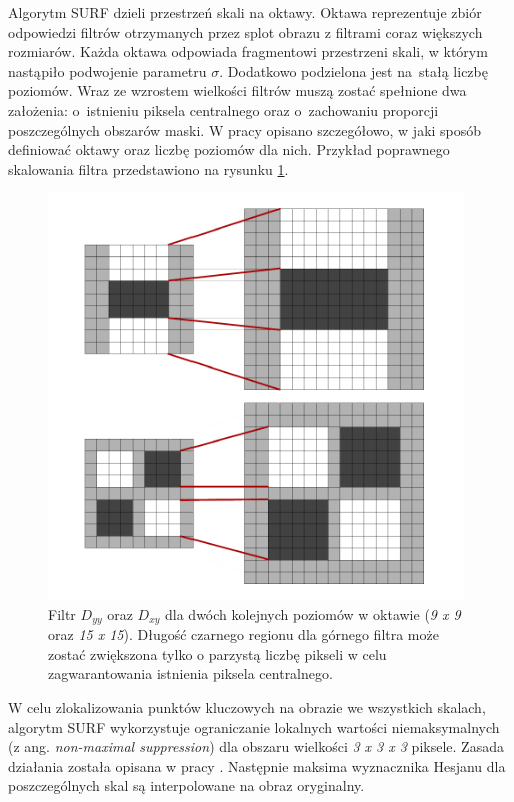 Algorytm SURF dzieli przestrzeń skali na oktawy. Oktawa reprezentuje zbiór odpowiedzi filtrów otrzymanych przez splot obrazu z filtrami coraz większych rozmiarów. Każda oktawa odpowiada fragmentowi przestrzeni skali, w którym nastąpiło podwojenie parametru $\sigma$. Dodatkowo podzielona jest na~stałą liczbę poziomów. Wraz ze wzrostem wielkości filtrów muszą zostać spełnione dwa założenia: o~istnieniu piksela centralnego oraz o~zachowaniu proporcji poszczególnych obszarów maski. W pracy \cite{Surf} opisano szczegółowo, w jaki sposób definiować oktawy oraz liczbę poziomów dla nich. Przykład poprawnego skalowania filtra przedstawiono na rysunku \ref{im: FiltersScale}. 
 
 \begin{figure}[h]
 	\includegraphics[width=11cm]{FiltersScale}
 	\centering
 	\caption{Filtr $D_{yy}$ oraz $D_{xy}$ dla dwóch kolejnych poziomów w oktawie (\textit{9 x 9} oraz \textit{15 x 15}). Długość czarnego regionu dla górnego filtra może zostać zwiększona tylko o parzystą liczbę pikseli w celu zagwarantowania istnienia piksela centralnego.}
 	\label{im: FiltersScale}
 \end{figure}
 
W celu zlokalizowania punktów kluczowych na obrazie we wszystkich skalach, algorytm SURF wykorzystuje ograniczanie lokalnych wartości niemaksymalnych (z ang. \textit{non-maximal suppression}) dla obszaru wielkości \textit{3 x 3 x 3} piksele. Zasada działania została opisana w pracy \cite{Surf}. Następnie maksima wyznacznika Hesjanu dla poszczególnych skal są interpolowane na obraz oryginalny.

